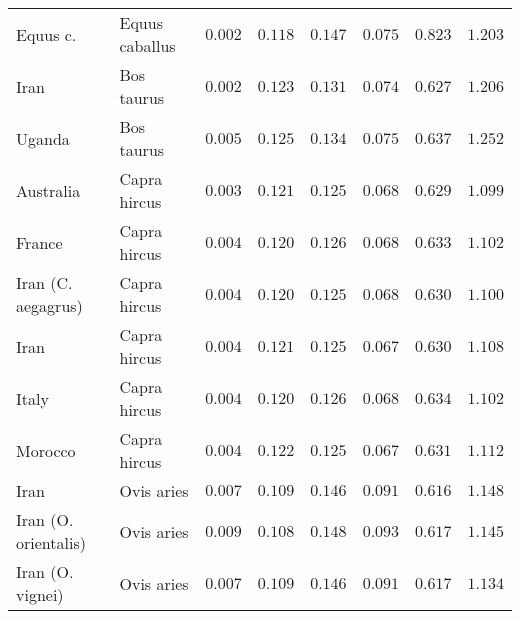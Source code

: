 \documentclass{article}
\begin{document}
\begin{center}
\begin{longtable*}{|l|l|r|r|r|r|r|r|}
            \bottomrule
            \endlastfoot
            Equus c. &      Equus caballus &               $ 0.002$ &                      $ 0.118$ &  $ 0.147$ &             $ 0.075$ &             $ 0.823$ &             $ 1.203$ \\
            Iran &          Bos taurus &               $ 0.002$ &                      $ 0.123$ &  $ 0.131$ &             $ 0.074$ &             $ 0.627$ &             $ 1.206$ \\
            Uganda &          Bos taurus &               $ 0.005$ &                      $ 0.125$ &  $ 0.134$ &             $ 0.075$ &             $ 0.637$ &             $ 1.252$ \\
            Australia &        Capra hircus &               $ 0.003$ &                      $ 0.121$ &  $ 0.125$ &             $ 0.068$ &             $ 0.629$ &             $ 1.099$ \\
            France &        Capra hircus &               $ 0.004$ &                      $ 0.120$ &  $ 0.126$ &             $ 0.068$ &             $ 0.633$ &             $ 1.102$ \\
            Iran (C. aegagrus) &        Capra hircus &               $ 0.004$ &                      $ 0.120$ &  $ 0.125$ &             $ 0.068$ &             $ 0.630$ &             $ 1.100$ \\
            Iran &        Capra hircus &               $ 0.004$ &                      $ 0.121$ &  $ 0.125$ &             $ 0.067$ &             $ 0.630$ &             $ 1.108$ \\
            Italy &        Capra hircus &               $ 0.004$ &                      $ 0.120$ &  $ 0.126$ &             $ 0.068$ &             $ 0.634$ &             $ 1.102$ \\
            Morocco &        Capra hircus &               $ 0.004$ &                      $ 0.122$ &  $ 0.125$ &             $ 0.067$ &             $ 0.631$ &             $ 1.112$ \\
            Iran &          Ovis aries &               $ 0.007$ &                      $ 0.109$ &  $ 0.146$ &             $ 0.091$ &             $ 0.616$ &             $ 1.148$ \\
            Iran (O. orientalis) &          Ovis aries &               $ 0.009$ &                      $ 0.108$ &  $ 0.148$ &             $ 0.093$ &             $ 0.617$ &             $ 1.145$ \\
            Iran (O. vignei) &          Ovis aries &               $ 0.007$ &                      $ 0.109$ &  $ 0.146$ &             $ 0.091$ &             $ 0.617$ &             $ 1.134$ \\

\end{longtable*}
\end{center}
\end{document}
